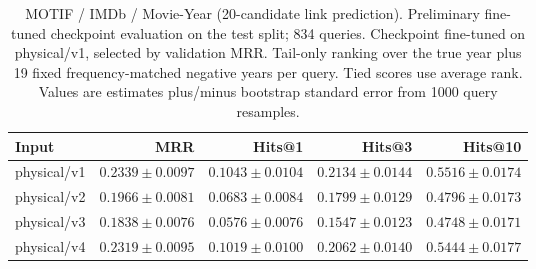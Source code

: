 \begin{table}[t]
\centering
\small
\begin{tabular}{lrrrr}
\toprule
Input & MRR & Hits@1 & Hits@3 & Hits@10 \\
\midrule
physical/v1 & $0.2339 \pm 0.0097$ & $0.1043 \pm 0.0104$ & $0.2134 \pm 0.0144$ & $0.5516 \pm 0.0174$ \\
physical/v2 & $0.1966 \pm 0.0081$ & $0.0683 \pm 0.0084$ & $0.1799 \pm 0.0129$ & $0.4796 \pm 0.0173$ \\
physical/v3 & $0.1838 \pm 0.0076$ & $0.0576 \pm 0.0076$ & $0.1547 \pm 0.0123$ & $0.4748 \pm 0.0171$ \\
physical/v4 & $0.2319 \pm 0.0095$ & $0.1019 \pm 0.0100$ & $0.2062 \pm 0.0140$ & $0.5444 \pm 0.0177$ \\
\bottomrule
\end{tabular}
\caption{MOTIF / IMDb / Movie-Year (20-candidate link prediction). Preliminary fine-tuned checkpoint evaluation on the test split; 834 queries. Checkpoint fine-tuned on physical/v1, selected by validation MRR. Tail-only ranking over the true year plus 19 fixed frequency-matched negative years per query. Tied scores use average rank. Values are estimates plus/minus bootstrap standard error from 1000 query resamples.}
\label{tab:motif-movie_year-link_prediction}
\end{table}
